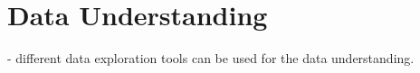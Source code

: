 \chapter{Data Understanding}

- different data exploration tools can be used for the data understanding.
